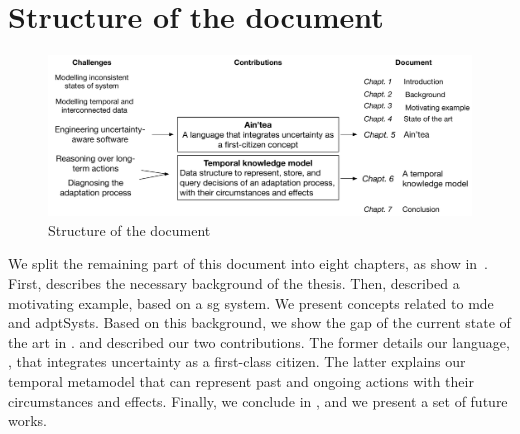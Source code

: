 \section{Structure of the document}

\begin{figure}
	\includegraphics[width=\linewidth]{img/chapt-intro/struct/struct}
	\caption{Structure of the document}
	\label{fig:intro:structDoc}
\end{figure}

We split the remaining part of this document into eight chapters, as show in~.
First,  describes the necessary background of the thesis.
Then,  described a motivating example, based on a \gls{sg} system.
We present concepts related to \gls{mde} and \glspl{adptSyst}.
Based on this background, we show the gap of the current state of the art in .
 and  described our two contributions.
The former details our language, \langName, that integrates uncertainty as a first-class citizen.
The latter explains our temporal \gls{metamodel} that can represent past and ongoing \glspl{action} with their circumstances and effects.
Finally, we conclude in , and we present a set of future works.